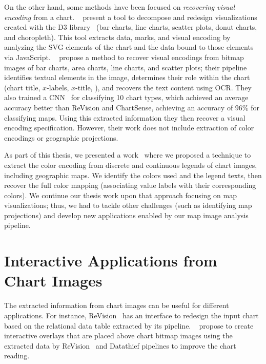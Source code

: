 On the other hand, some methods have been focused on \textit{recovering visual encoding} from a chart. \citeauthor{Harper2014}~\citep{Harper2014} present a tool to decompose and redesign visualizations created with the D3 library~\citep{Bostock2011} (\eg bar charts, line charts, scatter plots, donut charts, and choropleth). This tool extracts data, marks, and visual encoding by analyzing the \ac{SVG} elements of the chart and the data bound to those elements via JavaScript.
\citeauthor{Poco2017}~\citep{Poco2017} propose a method to recover visual encodings from bitmap images of bar charts, area charts, line charts, and scatter plots; their pipeline identifies textual elements in the image, determines their role within the chart (\eg chart title, $x$-labels, $x$-title, \etc), and recovers the text content using \ac{OCR}. They also trained a \ac{CNN}~\citep{LeCun1998} for classifying 10 chart types, which achieved an average accuracy better than ReVision and ChartSense, achieving an accuracy of 96\% for classifying maps. Using this extracted information they then recover a visual encoding specification. However, their work does not include extraction of color encodings or geographic projections.

As part of this thesis, we presented a work~\citep{Poco2017a} where we proposed a technique to extract the color encoding from discrete and continuous legends of chart images, including geographic maps. We identify the colors used and the legend texts, then recover the full color mapping (\ie associating value labels with their corresponding colors). We continue our thesis work upon that approach focusing on map visualizations; thus, we had to tackle other challenges (such as identifying map projections) and develop new applications enabled by our map image analysis pipeline.


\section{Interactive Applications from Chart Images}
\label{sec:intApps}
The extracted information from chart images can be useful for different applications. For instance, ReVision~\citep{Savva2011} has an interface to redesign the input chart based on the relational data table extracted by its pipeline. \citeauthor{Kong2012}~\citep{Kong2012} propose to create interactive overlays that are placed above chart bitmap images using the extracted data by ReVision~\citep{Savva2011} and Datathief \citep{Tummers2006} pipelines to improve the chart reading.

